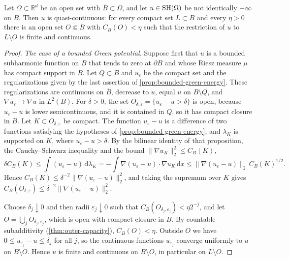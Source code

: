 \begin{theorem}\label{thm:subharmonic-quasicontinuity}
Let $\Omega\subset\mathbb R^d$ be an open set with $\overline B\subset\Omega$, and let $u\in\mathrm{SH}(\Omega)$ be not identically $-\infty$ on $B$. Then $u$ is quasi-continuous: for every compact set $L\subset B$ and every $\eta>0$ there is an open set $O\Subset B$ with $C_B(O)<\eta$ such that the restriction of $u$ to $L\setminus O$ is finite and continuous.
\end{theorem}
\begin{proof}
\emph{The case of a bounded Green potential.} Suppose first that $u$ is a bounded subharmonic function on $B$ that tends to zero at $\partial B$ and whose Riesz measure $\mu$ has compact support in $B$. Let $Q\subset B$ and $u_\varepsilon$ be the compact set and the regularizations given by the last assertion of \cref{prop:bounded-green-energy}. These regularizations are continuous on $\overline B$, decrease to $u$, equal $u$ on $B\setminus Q$, and $\nabla u_\varepsilon\to\nabla u$ in $L^2(B)$. For $\delta>0$, the set $O_{\delta,\varepsilon}=\{u_\varepsilon-u>\delta\}$ is open, because $u_\varepsilon-u$ is lower semicontinuous, and it is contained in $Q$, so it has compact closure in $B$. Let $K\subset O_{\delta,\varepsilon}$ be compact. The function $u_\varepsilon-u$ is a difference of two functions satisfying the hypotheses of \cref{prop:bounded-green-energy}, and $\lambda_K$ is supported on $K$, where $u_\varepsilon-u>\delta$. By the bilinear identity of that proposition, the Cauchy--Schwarz inequality and the bound $\|\nabla u_K\|_2^2\leq C_B(K)$,
\[
 \delta C_B(K)\leq\int(u_\varepsilon-u)\,\mathrm d\lambda_K
 =-\int\nabla(u_\varepsilon-u)\mathbin{\cdot}\nabla u_K\,\mathrm d x
 \leq\|\nabla(u_\varepsilon-u)\|_2\,C_B(K)^{1/2}.
\]
Hence $C_B(K)\leq\delta^{-2}\|\nabla(u_\varepsilon-u)\|_2^2$, and taking the supremum over $K$ gives $C_B(O_{\delta,\varepsilon})\leq\delta^{-2}\|\nabla(u_\varepsilon-u)\|_2^2$.

Choose $\delta_j\downarrow0$ and then radii $\varepsilon_j\downarrow0$ such that $C_B(O_{\delta_j,\varepsilon_j})<\eta2^{-j}$, and let $O=\bigcup_jO_{\delta_j,\varepsilon_j}$, which is open with compact closure in $B$. By countable subadditivity (\cref{thm:outer-capacity}), $C_B(O)<\eta$. Outside $O$ we have $0\leq u_{\varepsilon_j}-u\leq\delta_j$ for all $j$, so the continuous functions $u_{\varepsilon_j}$ converge uniformly to $u$ on $B\setminus O$. Hence $u$ is finite and continuous on $B\setminus O$, in particular on $L\setminus O$.


\end{proof}
